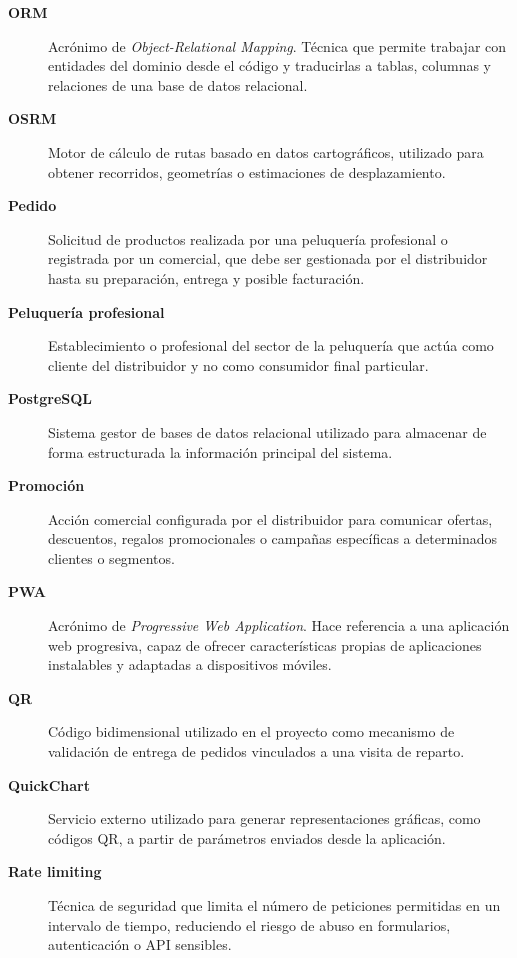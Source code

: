 \begin{description}
\item[\textbf{ORM}]
Acrónimo de \textit{Object-Relational Mapping}. Técnica que permite trabajar con entidades del dominio desde el código y traducirlas a tablas, columnas y relaciones de una base de datos relacional.

\item[\textbf{OSRM}]
Motor de cálculo de rutas basado en datos cartográficos, utilizado para obtener recorridos, geometrías o estimaciones de desplazamiento.

\item[\textbf{Pedido}]
Solicitud de productos realizada por una peluquería profesional o registrada por un comercial, que debe ser gestionada por el distribuidor hasta su preparación, entrega y posible facturación.

\item[\textbf{Peluquería profesional}]
Establecimiento o profesional del sector de la peluquería que actúa como cliente del distribuidor y no como consumidor final particular.

\item[\textbf{PostgreSQL}]
Sistema gestor de bases de datos relacional utilizado para almacenar de forma estructurada la información principal del sistema.

\item[\textbf{Promoción}]
Acción comercial configurada por el distribuidor para comunicar ofertas, descuentos, regalos promocionales o campañas específicas a determinados clientes o segmentos.

\item[\textbf{PWA}]
Acrónimo de \textit{Progressive Web Application}. Hace referencia a una aplicación web progresiva, capaz de ofrecer características propias de aplicaciones instalables y adaptadas a dispositivos móviles.

\item[\textbf{QR}]
Código bidimensional utilizado en el proyecto como mecanismo de validación de entrega de pedidos vinculados a una visita de reparto.

\item[\textbf{QuickChart}]
Servicio externo utilizado para generar representaciones gráficas, como códigos QR, a partir de parámetros enviados desde la aplicación.

\item[\textbf{Rate limiting}]
Técnica de seguridad que limita el número de peticiones permitidas en un intervalo de tiempo, reduciendo el riesgo de abuso en formularios, autenticación o API sensibles.


\end{description}
